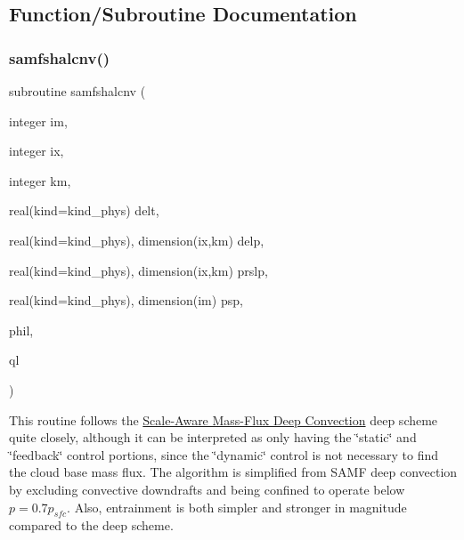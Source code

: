 \subsection{Function/\+Subroutine Documentation}
\mbox{\label{group___s_a_m_f__shal_ga8dbd74881cc19752c56c4fc49512e44c}} 
\subsubsection{\texorpdfstring{samfshalcnv()}{samfshalcnv()}}
{\footnotesize\ttfamily subroutine samfshalcnv (\begin{DoxyParamCaption}\item[{integer}]{im,  }\item[{integer}]{ix,  }\item[{integer}]{km,  }\item[{real(kind=kind\+\_\+phys)}]{delt,  }\item[{real(kind=kind\+\_\+phys), dimension(ix,km)}]{delp,  }\item[{real(kind=kind\+\_\+phys), dimension(ix,km)}]{prslp,  }\item[{real(kind=kind\+\_\+phys), dimension(im)}]{psp,  }\item[{}]{phil,  }\item[{}]{ql }\end{DoxyParamCaption})}

This routine follows the \hyperlink{group___s_a_m_f}{Scale-\/\+Aware Mass-\/\+Flux Deep Convection} deep scheme quite closely, although it can be interpreted as only having the \char`\"{}static\char`\"{} and \char`\"{}feedback\char`\"{} control portions, since the \char`\"{}dynamic\char`\"{} control is not necessary to find the cloud base mass flux. The algorithm is simplified from S\+A\+MF deep convection by excluding convective downdrafts and being confined to operate below $p=0.7p_{sfc}$. Also, entrainment is both simpler and stronger in magnitude compared to the deep scheme.


